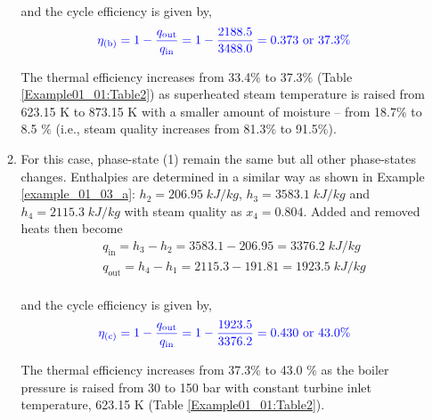 \begin{enumerate}
\begin{enumerate}
and the cycle efficiency is given by,
\begin{displaymath}
\textcolor{blue}{\eta_{\text{(b)}}=1-\displaystyle\frac{q_{\text{out}}}{q_{\text{in}}} = 1 - \displaystyle\frac{2188.5}{3488.0} = 0.373 \text{ or } 37.3\%}
\end{displaymath}

The thermal efficiency increases from 33.4$\%$ to 37.3$\%$ (Table \ref{Example01_01:Table2}) as superheated steam temperature is raised from 623.15 K to 873.15 K with a smaller amount of moisture -- from 18.7$\%$ to 8.5 $\%$ (i.e., steam quality increases from 81.3$\%$ to 91.5$\%$).

\item \label{example_01_03_c} For this case, phase-state (1) remain the same but all other phase-states changes. Enthalpies are determined in a similar way as shown in Example \ref{example_01_03_a}: $h_{2}=206.95\;kJ/kg$, $h_{3}=3583.1\;kJ/kg$ and $h_{4}=2115.3\;kJ/kg$ with steam quality as $x_{4}=0.804$.  Added and removed heats then become
\begin{eqnarray}
&& q_{\text{in}}=h_{3}-h_{2}=3583.1-206.95=3376.2\;kJ/kg \nonumber \\
&& q_{\text{out}}=h_{4}-h_{1}=2115.3-191.81=1923.5\;kJ/kg \nonumber \\
\end{eqnarray}

and the cycle efficiency is given by,
\begin{displaymath}
\textcolor{blue}{\eta_{\text{(c)}}=1-\displaystyle\frac{q_{\text{out}}}{q_{\text{in}}} = 1 - \displaystyle\frac{1923.5}{3376.2} = 0.430 \text{ or } 43.0\%}
\end{displaymath}

\medskip


The thermal efficiency increases from 37.3$\%$ to 43.0 $\%$ as the boiler pressure is raised from 30 to 150 bar with constant turbine inlet temperature, 623.15 K (Table \ref{Example01_01:Table2}).


\end{enumerate}
\end{enumerate}
